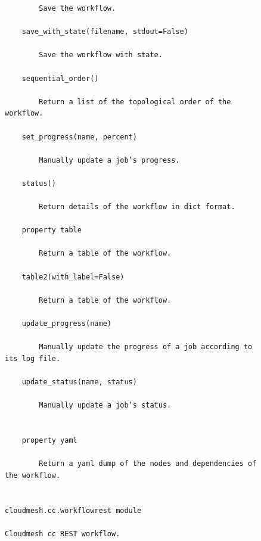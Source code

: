 \begin{figure}[htb]
\begin{verbatim}
        Save the workflow.

    save_with_state(filename, stdout=False)

        Save the workflow with state.

    sequential_order()

        Return a list of the topological order of the workflow.

    set_progress(name, percent)

        Manually update a job’s progress.

    status()

        Return details of the workflow in dict format.

    property table

        Return a table of the workflow.

    table2(with_label=False)

        Return a table of the workflow.

    update_progress(name)

        Manually update the progress of a job according to its log file.

    update_status(name, status)

        Manually update a job’s status.


    property yaml

        Return a yaml dump of the nodes and dependencies of the workflow.


cloudmesh.cc.workflowrest module

Cloudmesh cc REST workflow.



\end{verbatim}
\end{figure}


